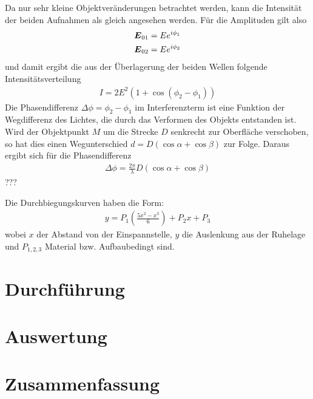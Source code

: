\documentclass[12pt]{article}
\renewcommand*\vec[1]{{\mbox{\boldmath\ensuremath{#1}}}}
\begin{document}
Da nur sehr kleine Objektveränderungen betrachtet werden, kann die Intensität der beiden
Aufnahmen als gleich angesehen werden. Für die Amplituden gilt also
\begin{align*}
 \vec E_{01} &= E e^{i\phi_1} \\
 \vec E_{02} &= E e^{i\phi_2}
\end{align*}
und damit ergibt die aus der Überlagerung der beiden Wellen folgende Intensitätsverteilung
\begin{align}
 I = 2E^2(1+\cos{(\phi_2 - \phi_1)})
\end{align}
Die Phasendifferenz $\Delta\phi = \phi_2 - \phi_1$ im Interferenzterm ist eine Funktion der Wegdifferenz des
Lichtes, die durch das Verformen des Objekts entstanden ist. Wird der Objektpunkt $M$ um
die Strecke $D$ senkrecht zur Oberfläche verschoben, so hat dies einen Wegunterschied $d = D(\cos{\alpha} + \cos{\beta})$ zur Folge.
Daraus ergibt sich für die Phasendifferenz
\begin{align}
 \Delta\phi = \frac{2\pi}{\lambda} D(\cos{\alpha} + \cos{\beta})
\end{align}
???



Die Durchbiegungskurven haben die Form:
\begin{align}
 y = P_1 \left(\frac{5 x^2 - x^3}{6}\right) + P_2 x + P_3
\end{align}
wobei $x$ der Abstand von der Einspannstelle, $y$ die Auslenkung aus der Ruhelage und $P_{1,2,3}$ Material bzw. Aufbaubedingt sind.

\section{Durchführung}
\section{Auswertung}
\section{Zusammenfassung}
\end{document}
